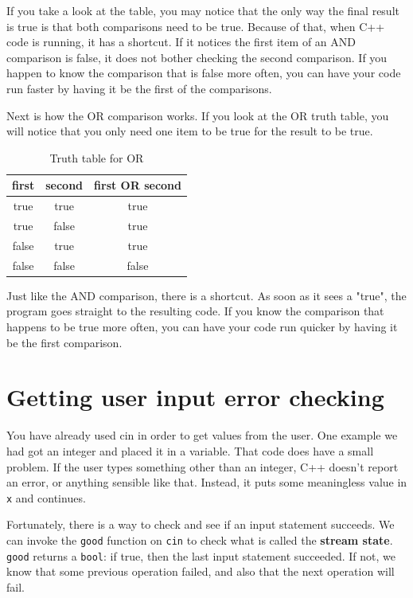 If you take a look at the table, you may notice that the only way the final result is true is that both comparisons need to be true. Because of that, when C++ code is running, it has a shortcut. If it notices the first item of an AND comparison is false, it does not bother checking the second comparison. If you happen to know the comparison that is false more often, you can have your code run faster by having it be the first of the comparisons.

Next is how the OR comparison works. If you look at the OR truth table, you will notice that you only need one item to be true for the result to be true.
\vspace{0.1in}
\begin{table}[h]
\centering
\begin{tabular}{ | c | c | c | }
\hline
 first & second & first OR second \\\hline
 true & true & true \\ 
 true & false & true \\  
 false & true & true \\
 false & false & false \\
\hline
\end{tabular}
    \caption{Truth table for OR}
    \label{tab:ortruth}
\end{table}
\vspace{0.1in}
Just like the AND comparison, there is a shortcut. As soon as it sees a "true", the program goes straight to the resulting code. If you know the comparison that happens to be true more often, you can have your code run quicker by having it be the first comparison.

\section{Getting user input error checking}

You have already used cin in order to get values from the user. One example we had got an integer and placed it in a variable. That code does have a small problem.
If the user types something other than an integer,
C++ doesn't report an error, or anything sensible like that.
Instead, it puts some meaningless value in {\tt x} and continues.

Fortunately, there is a way to check and see if an input
statement succeeds.  We can invoke the {\tt good} function on
{\tt cin} to check what is called the {\bf stream state}.
{\tt good} returns a {\tt bool}: if true, then the last input
statement succeeded.  If not, we know that some previous operation
failed, and also that the next operation will fail.

